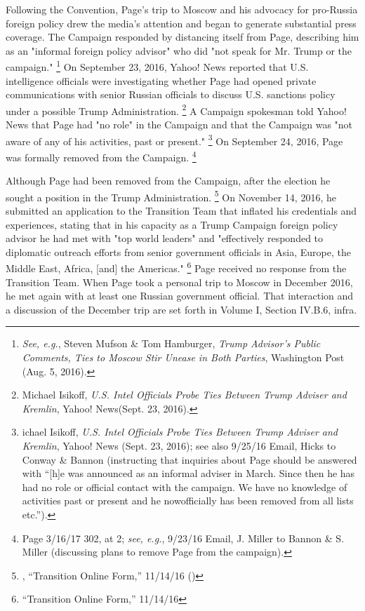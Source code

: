 Following the Convention, Page's trip to Moscow and his advocacy for pro-Russia foreign policy drew the media's attention and began to generate substantial press coverage.
The Campaign responded by distancing itself from Page, describing him as an "informal foreign policy advisor" who did "not speak for Mr. Trump or the campaign."%
\footnote{\textit{See, e.g.}, Steven Mufson \& Tom Hamburger, \textit{Trump Advisor’s Public Comments, Ties to Moscow Stir Unease in Both Parties}, Washington Post (Aug. 5, 2016).}
On September 23, 2016, Yahoo! News reported that U.S. intelligence officials were investigating whether Page had opened private communications with senior Russian officials to discuss U.S. sanctions policy under a possible Trump Administration.%
\footnote{Michael Isikoff, \textit{U.S. Intel Officials Probe Ties Between Trump Adviser and Kremlin}, Yahoo! News(Sept. 23, 2016).}
A Campaign spokesman told Yahoo! News that Page had "no role" in the Campaign and that the Campaign was "not aware of any of his activities, past or present."%
\footnote{ichael Isikoff, \textit{U.S. Intel Officials Probe Ties Between Trump Adviser and Kremlin}, Yahoo! News (Sept. 23, 2016); 
see also 9/25/16 Email, Hicks to Conway \& Bannon (instructing that inquiries about Page should be answered with “[h]e was announced as an informal adviser in March. 
Since then he has had no role or official contact with the campaign. 
We have no knowledge of activities past or present and he nowofficially has been removed from all lists etc.”).}
On September 24, 2016, Page was formally removed from the Campaign.%
\footnote{Page 3/16/17 302, at 2; 
\textit{see, e.g.}, 9/23/16 Email, J. Miller to Bannon \& S. Miller (discussing plans to remove Page from the campaign).}

Although Page had been removed from the Campaign, after the election he sought a position in the Trump Administration.%
\footnote{, “Transition Online Form,” 11/14/16 ()}
On November 14, 2016, he submitted an application to the Transition Team that inflated his credentials and experiences, stating that in his capacity as a Trump Campaign foreign policy advisor he had met with "top world leaders" and "effectively responded to diplomatic outreach efforts from senior government officials in Asia, Europe, the Middle East, Africa, [and] the Americas."%
\footnote{ “Transition Online Form,” 11/14/16 }
Page received no response from the Transition Team.
When Page took a personal trip to Moscow in December 2016, he met again with at least one Russian government official.
That interaction and a discussion of the December trip are set forth in Volume I, Section IV.B.6, infra.

